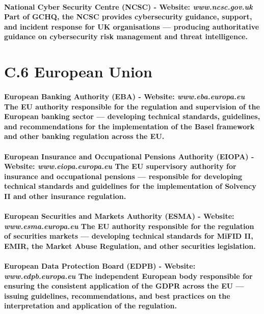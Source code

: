 \paragraph{\textbf{National Cyber Security Centre (NCSC)} - Website: \textit{www.ncsc.gov.uk} Part of GCHQ, the NCSC provides cybersecurity guidance, support, and incident response for UK organisations — producing authoritative guidance on cybersecurity risk management and threat intelligence.}

\section*{C.6 European Union}
\paragraph{\textbf{European Banking Authority (EBA)} - Website: \textit{www.eba.europa.eu} The EU authority responsible for the regulation and supervision of the European banking sector — developing technical standards, guidelines, and recommendations for the implementation of the Basel framework and other banking regulation across the EU.}
\paragraph{\textbf{European Insurance and Occupational Pensions Authority (EIOPA)} - Website: \textit{www.eiopa.europa.eu} The EU supervisory authority for insurance and occupational pensions — responsible for developing technical standards and guidelines for the implementation of Solvency II and other insurance regulation.}
\paragraph{\textbf{European Securities and Markets Authority (ESMA)} - Website: \textit{www.esma.europa.eu} The EU authority responsible for the regulation of securities markets — developing technical standards for MiFID II, EMIR, the Market Abuse Regulation, and other securities legislation.}
\paragraph{\textbf{European Data Protection Board (EDPB)} - Website: \textit{www.edpb.europa.eu} The independent European body responsible for ensuring the consistent application of the GDPR across the EU — issuing guidelines, recommendations, and best practices on the interpretation and application of the regulation.}
